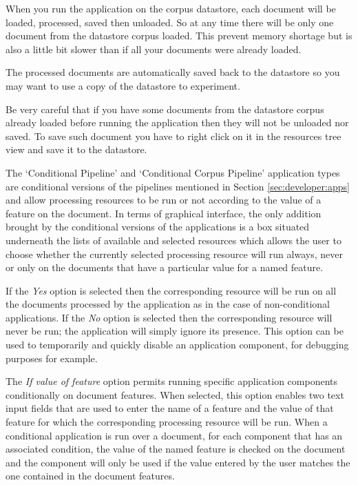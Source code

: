 When you run the application on the corpus datastore, each document will be
loaded, processed, saved then unloaded. So at any time there will be only
one document from the datastore corpus loaded. This prevent memory shortage
but is also a little bit slower than if all your documents were already
loaded.

The processed documents are automatically saved back to the datastore so you
may want to use a copy of the datastore to experiment.

Be very careful that if you have some documents from the datastore corpus
already loaded before running the application then they will not be unloaded
nor saved. To save such document you have to right click on it in the
resources tree view and save it to the datastore.


The `Conditional Pipeline' and `Conditional Corpus Pipeline' application
types are conditional versions of the pipelines mentioned in Section
\ref{sec:developer:apps} and allow processing resources to be run or not according
to the value of a feature on the document. In terms of graphical interface, the
only addition brought by the conditional versions of the applications is a box
situated underneath the lists of available and selected resources which allows
the user to choose whether the currently selected processing resource will run
always, never or only on the documents that have a particular value for a named
feature.

If the \emph{Yes} option is selected then the corresponding resource will be
run on all the documents processed by the application as in the case of
non-conditional applications. If the \emph{No} option is selected then the
corresponding resource will never be run; the application will simply ignore
its presence. This option can be used to temporarily and quickly disable an
application component, for debugging purposes for example.

The \emph{If value of feature} option permits running specific application
components conditionally on document features. When selected, this option
enables two text input fields that are used to enter the name of a feature and
the value of that feature for which the corresponding processing resource will
be run. When a conditional application is run over a document, for each
component that has an associated condition, the value of the named feature is
checked on the document and the component will only be used if the value
entered by the user matches the one contained in the document features.

